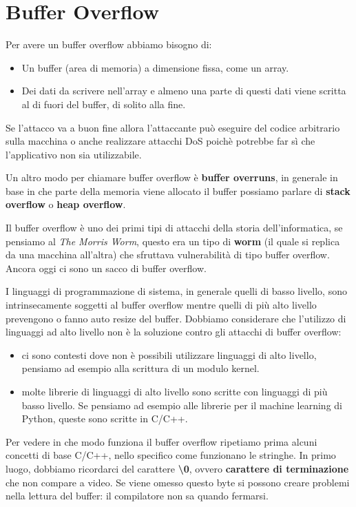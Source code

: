 \chapter{Buffer Overflow}

Per avere un buffer overflow abbiamo bisogno di:

\begin{itemize}
    \item Un buffer (area di memoria) a dimensione fissa, come un array.
    \item Dei dati da scrivere nell'array e almeno una parte di questi dati viene
    scritta al di fuori del buffer, di solito alla fine.
\end{itemize}

Se l'attacco va a buon fine allora l'attaccante può eseguire del codice arbitrario sulla macchina o anche
realizzare attacchi DoS poichè potrebbe far sì che l'applicativo non sia utilizzabile.

Un altro modo per chiamare buffer overflow è \textbf{buffer overruns}, in generale in base in che parte della memoria
viene allocato il buffer possiamo parlare di \textbf{stack overflow} o \textbf{heap overflow}. 

Il buffer overflow è uno dei primi tipi di attacchi della storia dell'informatica, se pensiamo al \textit{The Morris
Worm}, questo era un tipo di \textbf{worm} (il quale si replica da una macchina all'altra) che sfruttava vulnerabilità di
tipo buffer overflow. Ancora oggi ci sono un sacco di buffer overflow.

I linguaggi di programmazione di sistema, in generale quelli di basso livello, sono intrinsecamente soggetti al
buffer overflow mentre quelli di più alto livello prevengono o fanno auto resize del buffer. Dobbiamo
considerare che l'utilizzo di linguaggi ad alto livello non è la soluzione contro gli attacchi di buffer overflow: 

\begin{itemize}
    \item ci sono contesti dove non è possibili utilizzare linguaggi di alto livello, pensiamo ad esempio alla
    scrittura di un modulo kernel.
    \item molte librerie di linguaggi di alto livello sono scritte con linguaggi di più basso livello. Se pensiamo ad
    esempio alle librerie per il machine learning di Python, queste sono scritte in C/C++.
\end{itemize}

Per vedere in che modo funziona il buffer overflow ripetiamo prima alcuni concetti di base C/C++, nello
specifico come funzionano le stringhe.
In primo luogo, dobbiamo ricordarci del carattere \textbf{\textbackslash0}, ovvero \textbf{carattere di terminazione} che non compare a
video. Se viene omesso questo byte si possono creare problemi nella lettura del buffer: il compilatore non sa
quando fermarsi.

